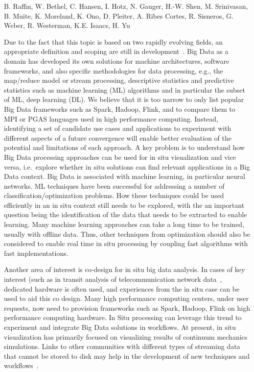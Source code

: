 \license

 B. Raffin, W. Bethel, C. Hansen, I. Hotz, N. Gauger, H.-W. Shen, M. Srinivasan, B. Muite, K. Moreland, K. Ono, D. Pleiter, A. Ribes Cortes, R. Sisneros, G. Weber, R. Westerman, K.E. Isaacs, H. Yu

\begin{refsection}

Due to the fact that this topic is based on two rapidly evolving fields, an appropriate definition and scoping are still in development~\cite{Asch18}. 
Big Data as a domain has developed its own solutions for machine architectures, software frameworks, and also specific methodologies for data processing, e.g., the map/reduce model or stream processing, descriptive statistics and predictive statistics such as machine learning (ML) algorithms and in particular the subset of ML, deep learning (DL). 
We believe that it is too narrow to only list popular Big Data frameworks such as Spark, Hadoop, Flink, and to compare them to MPI or PGAS languages used in high performance computing.
Instead, identifying a set of candidate use cases and applications to experiment with different aspects of a future convergence will enable better evaluation of the potential and limitations of each approach. 
A key problem is to understand how Big Data processing approaches can be used for in situ visualization and vice versa, i.e.~explore whether in situ solutions can find relevant applications in a Big Data context.
Big Data is associated with machine learning, in particular neural networks. 
ML techniques have been successful for addressing a number of classification/optimization problems. 
How these techniques could be used efficiently in an in situ context still needs to be explored, with the an important question being the identification of the data that needs to be extracted to enable learning.  
Many machine learning approaches can take a long time to be trained, usually with offline data. 
Thus, other techniques from optimization should also be considered to enable real time in situ processing by coupling fast algorithms with fast implementations.

Another area of interest is co-design for in situ big data analysis. 
In cases of key interest (such as in transit analysis of telecommunication network data~\cite{Grosman16}, dedicated hardware is often used, and experiences from the in situ case can be used to aid this co design.  
Many high performance computing centers, under user requests, now need to provision frameworks such as Spark, Hadoop, Flink on high performance computing hardware. 
In Situ processing can leverage this trend to experiment and integrate Big Data solutions in workflows. 
At present, in situ visualization has primarily focused on visualizing results of continuum mechanics simulations.
Links to other communities with different types of streaming data that cannot be stored to disk may help in the development of new techniques and workflows~\cite{Asch18,Grosman16}.


\end{refsection}
